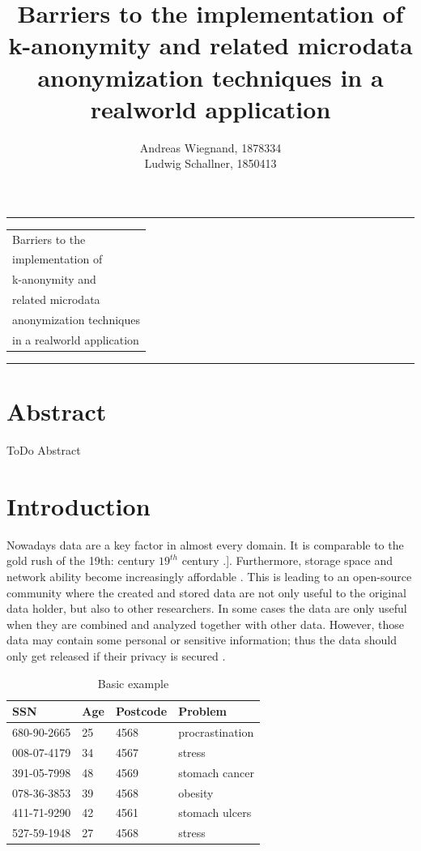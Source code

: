 \documentclass{llncs}
\begin{document}
\thispagestyle{empty}
\rule{\textwidth}{1pt}
\vspace{2pt}
\begin{flushright}
\Huge
\begin{tabular}{@{}l}
Barriers to the\\
implementation of\\
k-anonymity and\\
related microdata\\
anonymization techniques\\
in a realworld application\\[6pt]

\end{tabular}
\end{flushright}
\rule{\textwidth}{1pt}
\vfill
\title{Barriers to the implementation of k-anonymity and related microdata anonymization techniques in a realworld application}
\author{Andreas Wiegnand, 1878334\\
	Ludwig Schallner, 1850413}
\institute{}
\maketitle
%
\section*{Abstract}
ToDo Abstract
\newpage
\setcounter{page}{1}

\section{Introduction}
%
Nowadays data are a key factor in almost every domain. It is comparable to the gold rush of the 19th: century $19^{th}$ century \cite{datarevo}.]. Furthermore, storage space and network ability become increasingly affordable \cite{sweeney2002k}. 
This is leading to an open-source community where the created and stored data are not only useful to the original data holder, but also to other researchers. In some cases the data are only useful when they are combined and analyzed together with other data. However, those data may contain some personal or sensitive information; thus the data should only get released if their privacy is secured  \cite{li2006achieving}.\\
\begin{table}[]
	\centering
	\caption{Basic example}
	\label{intro_example}
	\begin{tabular}{@{}llll@{}}
		\toprule
		SSN         & Age & Postcode & Problem         \\ \midrule
		680-90-2665 & 25  & 4568     & procrastination \\
		008-07-4179 & 34  & 4567     & stress          \\
		391-05-7998 & 48  & 4569     & stomach cancer  \\
		078-36-3853 & 39  & 4568     & obesity         \\
		411-71-9290 & 42  & 4561     & stomach ulcers  \\
		527-59-1948 & 27  & 4568     & stress          \\ \bottomrule
	\end{tabular}
\end{table}
\end{document}
